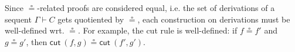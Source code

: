 \documentclass[a4paper,UKenglish,cleveref,autoref,thm-restate, anonymous]{lipics-v2021}
\newcommand{\proofbox}[1]{\begin{array}{c} #1 \end{array}}
\newcommand{\Larr}{\Leftarrow}
\newcommand{\Rarr}{\Rightarrow}
\newcommand{\mf}[1]{\mathsf{#1}}
\newcommand{\GG}{\Gamma}
\newcommand{\GD}{\Delta}
\newcommand{\GL}{\Lambda}
\renewcommand{\L}{$\mathtt{L}$}
\newcommand{\vd}{\vdash}
\newcommand{\ax}{\mathsf{ax}}
\newcommand{\Ll}{{\Larr}\mathsf{L}}
\newcommand{\Rl}{{\Rarr}\mathsf{L}}
\newcommand{\cut}{\mf{cut}}
\begin{document}
Since $\circeq$-related proofs are considered equal, i.e. the set of derivations of a sequent $\GG \vd C$ gets quotiented by $\circeq$,
each construction on derivations must be well-defined wrt. $\circeq$. For example, the cut rule is well-defined: if $f \circeq f'$ and $g \circeq g'$, then $\cut\ (f,g) \circeq \cut \ (f',g')$.
\end{document}
